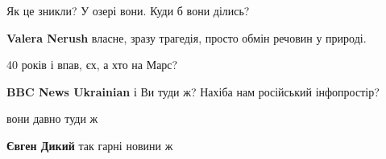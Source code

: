 \begin{itemize}
\begin{itemize}
\end{itemize}

 
Як це зникли? У озері вони. Куди б вони ділись?

\begin{itemize}
 
\textbf{Valera Nerush} власне, зразу трагедія, просто обмін речовин у природі.
\end{itemize}

 
40 років і впав, єх, а хто на Марс?

 
\textbf{BBC News Ukrainian} і Ви туди ж? Нахіба нам російський інфопростір?

\begin{itemize}
 
вони давно туди ж

 
\textbf{Євген Дикий} так гарні новини ж


\end{itemize}
\end{itemize}
